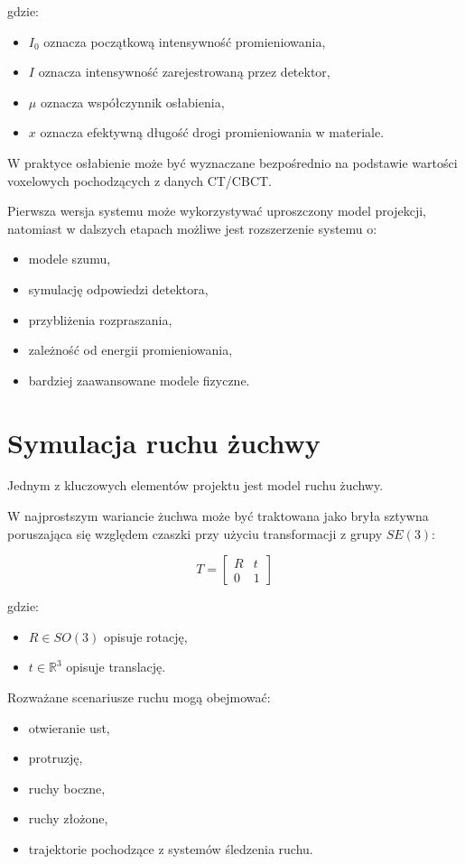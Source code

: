 \documentclass[11pt,a4paper]{article}
\begin{document}
gdzie:
\begin{itemize}
\item $I_0$ oznacza początkową intensywność promieniowania,
\item $I$ oznacza intensywność zarejestrowaną przez detektor,
\item $\mu$ oznacza współczynnik osłabienia,
\item $x$ oznacza efektywną długość drogi promieniowania w materiale.
\end{itemize}

W praktyce osłabienie może być wyznaczane bezpośrednio na podstawie wartości voxelowych pochodzących z danych CT/CBCT.

Pierwsza wersja systemu może wykorzystywać uproszczony model projekcji, natomiast w dalszych etapach możliwe jest rozszerzenie systemu o:
\begin{itemize}
\item modele szumu,
\item symulację odpowiedzi detektora,
\item przybliżenia rozpraszania,
\item zależność od energii promieniowania,
\item bardziej zaawansowane modele fizyczne.
\end{itemize}

\section{Symulacja ruchu żuchwy}

Jednym z kluczowych elementów projektu jest model ruchu żuchwy.

W najprostszym wariancie żuchwa może być traktowana jako bryła sztywna poruszająca się względem czaszki przy użyciu transformacji z grupy $SE(3)$:

\begin{equation}
T =
\begin{bmatrix}
R & t \\
0 & 1
\end{bmatrix}
\end{equation}

gdzie:
\begin{itemize}
\item $R \in SO(3)$ opisuje rotację,
\item $t \in \mathbb{R}^3$ opisuje translację.
\end{itemize}

Rozważane scenariusze ruchu mogą obejmować:
\begin{itemize}
\item otwieranie ust,
\item protruzję,
\item ruchy boczne,
\item ruchy złożone,
\item trajektorie pochodzące z systemów śledzenia ruchu.
\end{itemize}
\end{document}
